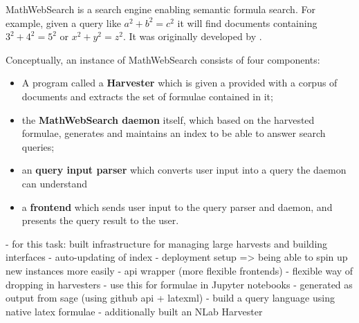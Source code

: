 \documentclass[a4paper,twoside,12pt]{article}
\begin{document}
MathWebSearch  is a search engine enabling semantic formula search. 
For example, given a query like $a^2 + b^2 = c^2$ it will find documents containing $3^2 + 4^2 = 5^2$ or $x^2 + y^2 = z^2$.
It was originally developed by . 

Conceptually, an instance of MathWebSearch consists of four components:
\begin{itemize}
    \item A program called a \textbf{Harvester} which is given a provided with a corpus of documents and extracts the set of formulae contained in it;
    \item the \textbf{MathWebSearch daemon} itself, which based on the harvested formulae, generates and maintains an index to  be able to answer search queries;
    \item an \textbf{query input parser} which converts user input into a query the daemon can understand
    \item a \textbf{frontend} which sends user input to the query parser and daemon, and presents the query result to the user.  
\end{itemize}

- for this task: built infrastructure for managing large harvests and building interfaces
    - auto-updating of index
    - deployment setup => being able to spin up new instances more easily
    - api wrapper (more flexible frontends)
    - flexible way of dropping in harvesters
- use this for formulae in Jupyter notebooks
    - generated as output from sage (using github api + latexml)
    - build a query language using native latex formulae
- additionally built an NLab Harvester

\end{document}
